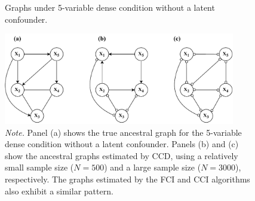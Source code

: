 \documentclass[twoside, 11pt]{article}
\newcommand*{\figref}[2][]{%
  \hyperref[{fig:#2}]{%
    Figure~\ref*{fig:#2}%
    \ifx\\#1\\%
    \else
      #1%
    \fi
  }%
}
\begin{document}
\begin{appendices}


\begin{figure}[!t]
    \centering
        \caption{Graphs under 5-variable dense condition without a latent confounder.}
        \includegraphics[width=0.9\textwidth]{figures/FigF1.pdf}
        \vspace{3mm}
        \caption*{\small{\textit{Note.} Panel (a) shows the true ancestral graph for the 5-variable dense condition without a latent confounder. Panels (b) and (c) show the ancestral graphs estimated by CCD, using a relatively small sample size ($N = 500$) and a large sample size ($N = 3000$), respectively. The graphs estimated by the FCI and CCI algorithms also exhibit a similar pattern.}} 
    \label{fig:F1}
\end{figure}


\end{appendices}
\end{document}
